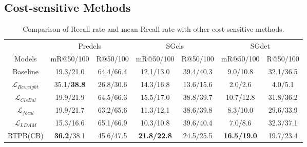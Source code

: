 \documentclass[letterpaper]{article} %
\begin{document}
\subsection{Cost-sensitive Methods}
\begin{table}[!ht]
    \centering
	\begin{tabular}{c|cc|cc|cc}
		\hline
		& \multicolumn{2}{c|}{Predcls} & \multicolumn{2}{c|}{SGcls} & \multicolumn{2}{c}{SGdet} \\
		Models                         & mR@50/100     & R@50/100     & mR@50/100    & R@50/100    & mR@50/100    & R@50/100    \\ \hline
		Baseline   & 19.3/21.0     & 64.4/66.4    & 12.1/13.0    & 39.4/40.3   & 9.0/10.8     & 32.1/36.5           \\
		$\mathcal{L}_{Reweight}$  & 35.1/\textbf{38.8} & 26.8/30.6 & 14.3/16.8  & 13.6/15.6 & 2.0/2.6 & 4.0/5.1           \\
		$\mathcal{L}_{ClsBal}$     & 19.9/21.9 & 64.5/66.3 & 15.5/17.0  & 38.8/39.7 & 10.7/12.8 & 31.8/36.2           \\
		$\mathcal{L}_{focal}$     & 19.9/21.7 & 63.2/65.6 & 11.3/12.1  & 38.6/39.8 & 8.3/10.0 & 29.6/33.9          \\
		$\mathcal{L}_{LDAM}$      & 15.3/16.6 & 65.1/66.9 & 10.3/10.8    & 39.6/40.4  & 7.0/8.6 & 32.3/37.1        \\
		RTPB(CB)      & \textbf{36.2}/38.1    & 45.6/47.5    & \textbf{21.8/22.8}    & 24.5/25.5   & \textbf{16.5/19.0}    & 19.7/23.4 \\ \hline
	\end{tabular}
	\caption{Comparison of Recall rate and mean Recall rate with other cost-sensitive methods.}
	\label{tab:debias}
\end{table}
\end{document}
